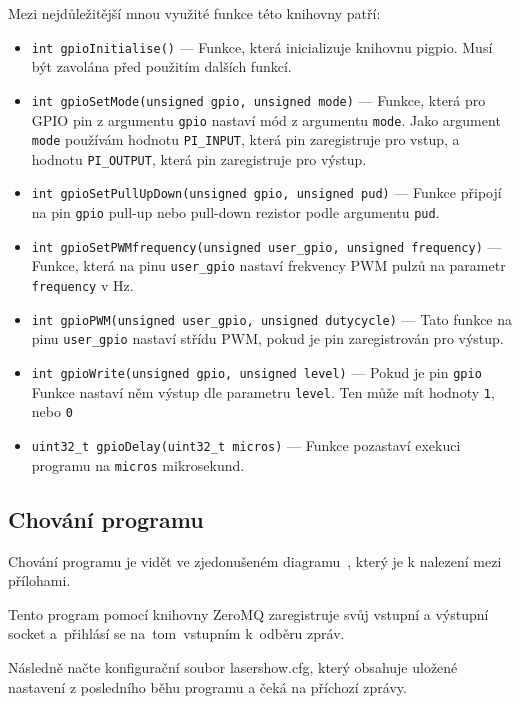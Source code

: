 Mezi nejdůležitější mnou využité funkce této knihovny patří:
\begin{itemize}
  \item \texttt{int gpioInitialise()} --- Funkce, která inicializuje knihovnu pigpio. Musí být zavolána před použitím dalších funkcí.
  \item \texttt{int gpioSetMode(unsigned gpio, unsigned mode)} --- Funkce, která pro GPIO pin z argumentu \texttt{gpio} nastaví mód z argumentu \texttt{mode}. Jako argument \texttt{mode} používám hodnotu \texttt{PI_INPUT}, která pin zaregistruje pro vstup, a hodnotu \texttt{PI_OUTPUT}, která pin zaregistruje pro výstup.
  \item \texttt{int gpioSetPullUpDown(unsigned gpio, unsigned pud)} --- Funkce připojí na pin \texttt{gpio} pull-up nebo pull-down rezistor podle argumentu \texttt{pud}.
  \item \texttt{int gpioSetPWMfrequency(unsigned user_gpio, unsigned frequency)} --- Funkce, která na pinu \texttt{user_gpio} nastaví frekvency PWM pulzů na parametr \texttt{frequency} v Hz.
  \item \texttt{int gpioPWM(unsigned user_gpio, unsigned dutycycle)} --- Tato funkce na pinu \texttt{user_gpio} nastaví střídu PWM, pokud je pin zaregistrován pro výstup.
  \item \texttt{int gpioWrite(unsigned gpio, unsigned level)} --- Pokud je pin \texttt{gpio} Funkce nastaví něm výstup dle parametru \texttt{level}. Ten může mít hodnoty \texttt{1}, nebo \texttt{0}
  \item \texttt{uint32_t gpioDelay(uint32_t micros)} --- Funkce pozastaví exekuci programu na \texttt{micros} mikrosekund.
\end{itemize}

\subsection{Chování programu}
Chování programu je vidět ve zjedonušeném diagramu~\cite{fig:lasershow-flowchart}, který je k nalezení mezi přílohami.

Tento program pomocí knihovny ZeroMQ zaregistruje svůj vstupní a výstupní socket a~přihlásí se na~tom~vstupním k~odběru zpráv.

Následně načte konfigurační soubor lasershow.cfg, který obsahuje uložené nastavení z posledního běhu programu a čeká na příchozí zprávy.

